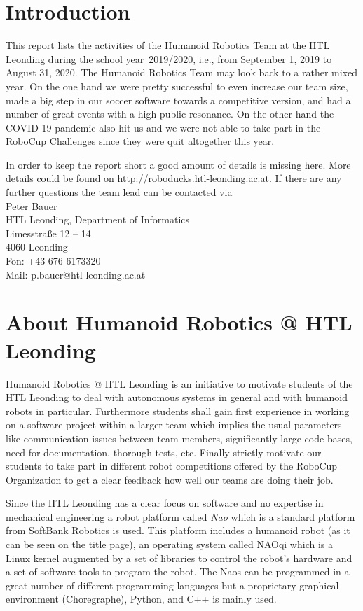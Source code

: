\documentclass[11pt]{article}
\begin{document}
\tableofcontents
\newpage

\section{Introduction}
This report lists the activities of the Humanoid Robotics Team at the HTL Leonding during the school year~2019/2020, i.e., from September 1, 2019 to August 31, 2020. The Humanoid Robotics Team may look back to a rather mixed year. On the one hand we were pretty successful to even increase our team size, made a big step in our soccer software towards a competitive version, and had a number of great events with a high public resonance. On the other hand the COVID-19 pandemic also hit us and we were not able to take part in the RoboCup Challenges since they were quit altogether this year.

In order to keep the report short a good amount of details is missing here. More details could be found on \url{http://roboducks.htl-leonding.ac.at}. If there are any further questions the team lead can be contacted via \\[1em]
Peter Bauer\\
HTL Leonding, Department of Informatics\\
Limesstraße 12 -- 14\\
4060 Leonding\\
Fon: +43 676 6173320\\
Mail: p.bauer@htl-leonding.ac.at

\section{About Humanoid Robotics @ HTL Leonding}\label{sec:about}
Humanoid Robotics @ HTL Leonding is an initiative to motivate students of the HTL Leonding to deal with autonomous systems in general and with humanoid robots in particular. Furthermore students shall gain first experience in working on a software project within a larger team which implies the usual parameters like communication issues between team members, significantly large code bases, need for documentation, thorough tests, etc. Finally strictly motivate our students to take part in different robot competitions offered by the RoboCup Organization to get a clear feedback how well our teams are doing their job.

Since the HTL Leonding has a clear focus on software and no expertise in mechanical engineering a robot platform called {\em Nao} which is a standard platform from SoftBank Robotics is used. This platform includes a humanoid robot (as it can be seen on the title page), an operating system called NAOqi which is a Linux kernel augmented by a set of libraries to control the robot's hardware and a set of software tools to program the robot. The Naos can be programmed in a great number of different programming languages but a proprietary graphical environment (Choregraphe), Python, and  C++ is mainly used.
\end{document}
